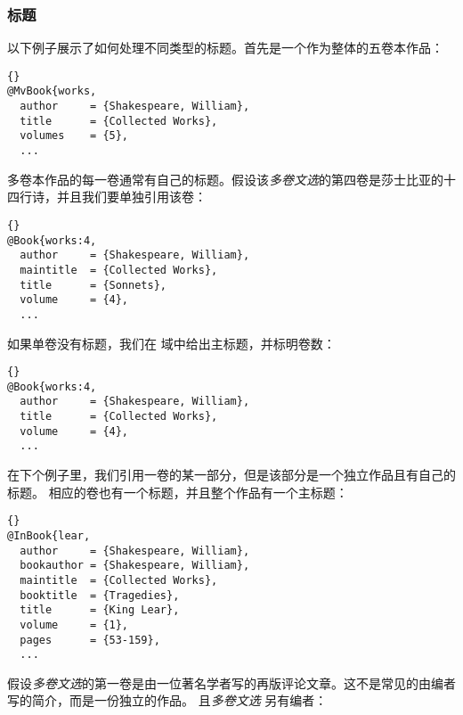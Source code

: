 \subsubsection{标题}
\label{bib:use:ttl}

以下例子展示了如何处理不同类型的标题。首先是一个作为整体的五卷本作品：

\begin{lstlisting}[style=bibtex]{}
@MvBook{works,
  author     = {Shakespeare, William},
  title      = {Collected Works},
  volumes    = {5},
  ...
\end{lstlisting}
%
多卷本作品的每一卷通常有自己的标题。假设该\emph{多卷文选}的第四卷是莎士比亚的十四行诗，并且我们要单独引用该卷：

\begin{lstlisting}[style=bibtex]{}
@Book{works:4,
  author     = {Shakespeare, William},
  maintitle  = {Collected Works},
  title      = {Sonnets},
  volume     = {4},
  ...
\end{lstlisting}
%
如果单卷没有标题，我们在  域中给出主标题，并标明卷数：

\begin{lstlisting}[style=bibtex]{}
@Book{works:4,
  author     = {Shakespeare, William},
  title      = {Collected Works},
  volume     = {4},
  ...
\end{lstlisting}
%
在下个例子里，我们引用一卷的某一部分，但是该部分是一个独立作品且有自己的标题。
相应的卷也有一个标题，并且整个作品有一个主标题：

\begin{lstlisting}[style=bibtex]{}
@InBook{lear,
  author     = {Shakespeare, William},
  bookauthor = {Shakespeare, William},
  maintitle  = {Collected Works},
  booktitle  = {Tragedies},
  title      = {King Lear},
  volume     = {1},
  pages      = {53-159},
  ...
\end{lstlisting}
%
假设\emph{多卷文选}的第一卷是由一位著名学者写的再版评论文章。这不是常见的由编者写的简介，而是一份独立的作品。
且\emph{多卷文选} 另有编者：

